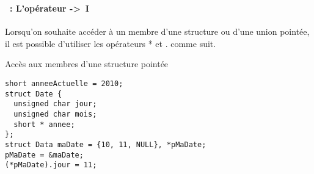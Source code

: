 \begin{frame}[containsverbatim]
  \frametitle{\secname}
  \framesubtitle{\subsecname~: L'opérateur ->~I}

  Lorsqu'on souhaite accéder à un membre d'une structure ou d'une union pointée, il est possible d'utiliser les opérateurs * et . comme suit.
  \begin{exampleblock}{Accès aux membres d'une structure pointée}
    \begin{verbatim}
short anneeActuelle = 2010;
struct Date { 
  unsigned char jour; 
  unsigned char mois; 
  short * annee;
};
struct Data maDate = {10, 11, NULL}, *pMaDate;
pMaDate = &maDate;
(*pMaDate).jour = 11;\end{verbatim}
  \end{exampleblock}
\end{frame}

